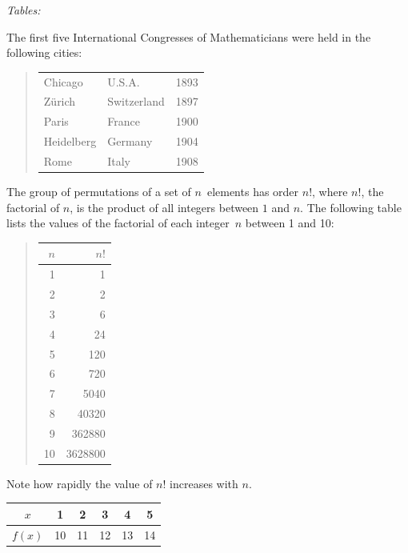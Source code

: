 \documentclass[12pt]{article}
\begin{document}
\noindent
\begin{large}\textit{Tables:}\end{large}

The first five International Congresses of Mathematicians were held in the following cities:
\begin{quote}
\begin{tabular}{lll}
Chicago&U.S.A.&1893\\
Z\"{u}rich&Switzerland&1897\\
Paris&France&1900\\
Heidelberg&Germany&1904\\
Rome&Italy&1908
\end{tabular}
\end{quote}

The group of permutations of a set of $n$~elements has order $n!$, where $n!$, the factorial of $n$, is the product of all integers between $1$ and $n$. The following table lists the values of the factorial of each integer~$n$ between 1 and 10:
\begin{quote}
\begin{tabular}{|r|r|}
\hline
$n$&$n!$\\
\hline
1&1\\
2&2\\
3&6\\
4&24\\
5&120\\
6&720\\
7&5040\\
8&40320\\
9&362880\\
10&3628800\\
\hline
\end{tabular}
\end{quote}
Note how rapidly the value of $n!$ increases with $n$. \\

\begin{tabular}{|c|c|c|c|c|c|}
\hline
$x$ & 1 & 2 & 3 & 4 & 5 \\ 
\hline
$f(x)$ & 10 & 11 & 12 & 13 & 14 \\ 
\hline
\end{tabular} \\
\end{document}
